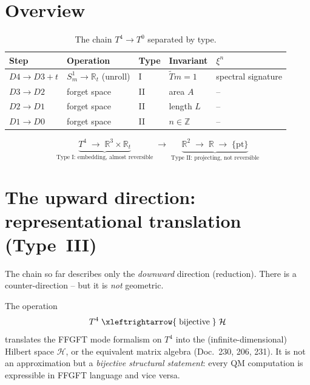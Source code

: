 \section{Overview}

\begin{table}[h!]
\centering
\begin{tabular}{lllll}
\hline
\textbf{Step} & \textbf{Operation} & \textbf{Type} & \textbf{Invariant} & \textbf{$\xi^n$} \\
\hline
$D4\to D3{+}t$ & $S^1_m\to\mathbb{R}_t$ (unroll) & I & $\tilde{T}m=1$ & spectral signature \\
$D3\to D2$ & forget space & II & area $A$ & -- \\
$D2\to D1$ & forget space & II & length $L$ & -- \\
$D1\to D0$ & forget space & II & $n\in\mathbb{Z}$ & -- \\
\hline
\end{tabular}
\caption{The chain $T^4 \to T^0$ separated by type.}
\end{table}

\[
\underbrace{T^4 \;\longrightarrow\; \mathbb{R}^3\times\mathbb{R}_t}_{\text{Type I: embedding, almost reversible}}
\;\longrightarrow\;
\underbrace{\mathbb{R}^2 \;\longrightarrow\; \mathbb{R} \;\longrightarrow\; \{\mathrm{pt}\}}_{\text{Type II: projecting, not reversible}}
\]

\section{The upward direction: representational translation (Type~III)}

The chain so far describes only the \emph{downward} direction (reduction). There
is a counter-direction -- but it is \emph{not} geometric.

\begin{definition}\label{def:typeIII}
The operation
\[
  T^4 \;\xleftrightarrow{\;\text{bijective}\;}\; \mathcal{H}
\]
translates the FFGFT mode formalism on $T^4$ into the (infinite-dimensional)
Hilbert space $\mathcal{H}$, or the equivalent matrix algebra (Doc.~230, 206,
231). It is not an approximation but a \emph{bijective structural statement}:
every QM computation is expressible in FFGFT language and vice versa.
\end{definition}

